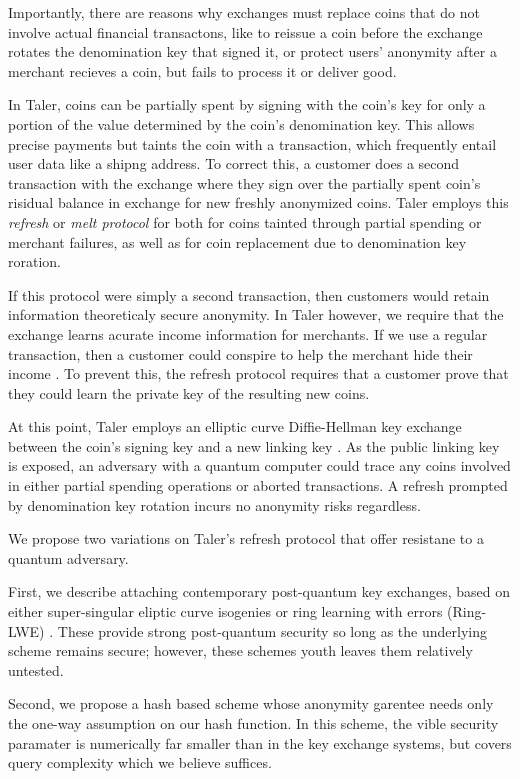 \documentclass{llncs}
\begin{document}
Importantly, there are reasons why exchanges must replace coins that
do not involve actual financial transactons, like to reissue a coin
before the exchange rotates the denomination key that signed it, or
protect users' anonymity after a merchant recieves a coin, but fails
to process it or deliver good.

In Taler, coins can be partially spent by signing with the coin's key
for only a portion of the value determined by the coin's denomination
key.  This allows precise payments but taints the coin with a
transaction,  which frequently entail user data like a shipng address.  
To correct this, a customer does a second transaction with the exchange
where they sign over the partially spent coin's risidual balance
in exchange for new freshly anonymized coins.  
Taler employs this {\em refresh} or {\em melt protocol} for
both for coins tainted through partial spending or merchant failures,
as well as for coin replacement due to denomination key roration.

If this protocol were simply a second transaction, then customers
would retain information theoreticaly secure anonymity.  
In Taler however, we require that the exchange learns acurate income
information for merchants.  If we use a regular transaction, then
a customer could conspire to help the merchant hide their income
\cite[]{Taler??}.
To prevent this, the refresh protocol requires that a customer prove
that they could learn the private key of the resulting new coins.

At this point, Taler employs an elliptic curve Diffie-Hellman key
exchange between the coin's signing key and a new linking key 
\cite[??]{Taler??}.  As the public linking key is exposed,
an adversary with a quantum computer could trace any coins involved
in either partial spending operations or aborted transactions.
A refresh prompted by denomination key rotation incurs no anonymity
risks regardless.

\smallskip

We propose two variations on Taler's refresh protocol that offer
resistane to a quantum adversary.

First, we describe attaching contemporary post-quantum key exchanges,
based on either super-singular eliptic curve isogenies \cite{SIDH} or
ring learning with errors (Ring-LWE) \cite{Peikert14,NewHope}.
These provide strong post-quantum security so long as the underlying
scheme remains secure; however, these schemes youth leaves them
relatively untested.

Second, we propose a hash based scheme whose anonymity garentee needs
only the one-way assumption on our hash function.  In this scheme,
the vible security paramater is numerically far smaller than in the
key exchange systems, but covers query complexity which we believe
suffices.
\end{document}
